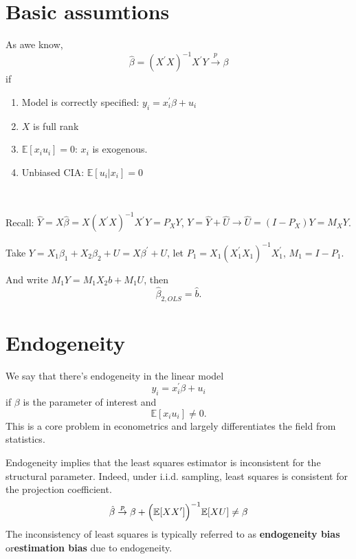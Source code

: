 \section{Basic assumtions}
\label{sec:basic-assumtions}

As awe know, \[
    \hat{\beta} = (X^{\prime} X)^{-1}X^{\prime} Y \overset{p}{\to} \beta
\]
if
\begin{enumerate}
    \item Model is correctly specified: $y_i = x_i^{\prime} \beta + u_i$
    \item $X$ is full rank
    \item $\mathbb{E}[x_i u_i] = 0$: $x_i$ is exogenous.
    \item Unbiased CIA: $\mathbb{E}[u_i|x_i] = 0$
\end{enumerate}

\begin{theorem}
    \label{thm:FWL}
    \ 

    Recall: $\hat{Y} = X \hat{\beta} = X(X^{\prime} X)^{-1}X^{\prime} Y = P_X Y$, $Y = \hat{Y} + \hat{U} \rightarrow \hat{U} = (I - P_X)Y = M_X Y$.

    Take $Y = X_1 \beta_1 + X_2 \beta_2 + U = X \beta ^{\prime} +U$,
    let $P_1 = X_1 (X_1^{\prime} X_1)^{-1}X_1^{\prime} $, $M_1 = I - P_1$.

    And write $M_1 Y = M_1 X_2 b + M_1 U$, then
    \[\hat{\beta}_{2, OLS} = \hat{b}.\]
\end{theorem}

\section{Endogeneity}
\label{sec:endogeneity}

We say that there's endogeneity in the linear model
\[y_i = x_i^{\prime} \beta + u_i\]
if $\beta$ is the parameter of interest and
\[\mathbb{E}[x_i u_i] \neq 0.\]
This is a core problem in econometrics and largely differentiates the field from statistics.

Endogeneity implies that the least squares estimator is inconsistent for the structural parameter.
Indeed, under i.i.d. sampling, least squares is consistent for the projection coefficient.
\begin{gather*}
    \hat{\beta} \overset{p}{\rightarrow} \beta + \Bigl(\mathbb{E}[X X^{\prime}] \Bigr)^{-1} \mathbb{E}[X U] \neq \beta 
\end{gather*}
The inconsistency of least squares is typically referred to as \textbf{endogeneity bias} or\textbf{estimation bias} due to
endogeneity.

